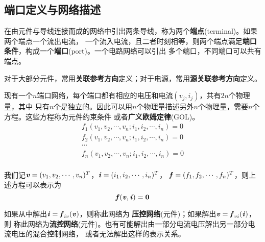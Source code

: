     \subsection{端口定义与网络描述}
    \par 在由元件与导线连接而成的网络中引出两条导线，称为两个\textbf{端点}(terminal)。如果两个端点一个流出电流，
    一个流入电流，且二者时刻相等，则两个端点满足\textbf{端口条件}，构成一个\textbf{端口}(port)。一个电路网络可以引出
    多个端口，不同端口可以共有端点。
    \par 对于大部分元件，常用\textbf{关联参考方向}定义；对于电源，常用\textbf{源关联参考方向}定义。
    \begin{center}
        \qquad
    \end{center}
    \par 现有一个$n$端口网络，每个端口都有相应的电压和电流$(v_j,i_j)$，共有$2n$个物理量，其中
    只有$n$个是独立的。因此可以用$n$个物理量描述另外$n$个物理量，需要$n$个方程。这些方程称为元件约束条件
    或者\textbf{广义欧姆定律}(GOL)。
    \begin{align*}
        f_1(v_1,v_2,\cdots,v_n;i_1,i_2,\cdots,i_n)=0\\
        f_2(v_1,v_2,\cdots,v_n;i_1,i_2,\cdots,i_n)=0\\
        \cdots\\
        f_n(v_1,v_2,\cdots,v_n;i_1,i_2,\cdots,i_n)=0\\
    \end{align*}
    \par 我们记$\textbf{\textit{v}}=(v_1,v_2,\cdots,v_n)^{T}$，$\textbf{\textit{i}}=(i_1,i_2,\cdots,i_n)^{T}$，
    $\textbf{\textit{f}}=(f_1,f_2,\cdots,f_n)^{T}$，则上述方程可以表示为
    \[
    \textbf{\textit{f}}(\textbf{\textit{v}},\textbf{\textit{i}})=\textbf{0}    
    \]
    \par 如果从中解出$\textbf{\textit{i}}=\textbf{\textit{f}}_{iv}(\textbf{\textit{v}})$，则称此网络为
    \textbf{压控网络}(元件)；如果解出$\textbf{\textit{v}}=\textbf{\textit{f}}_{vi}(\textbf{\textit{i}})$，则
    称此网络为\textbf{流控网络}(元件)。也有可能解出由一部分电流电压解出另一部分电流电压的混合控制网络，
    或者无法解出这样的表示关系。

